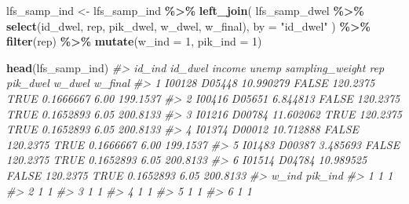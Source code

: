 \documentclass[
]{article}
\newenvironment{Shaded}{\begin{snugshade}}{\end{snugshade}}
\newcommand{\AttributeTok}[1]{\textcolor[rgb]{0.13,0.29,0.53}{#1}}
\newcommand{\CommentTok}[1]{\textcolor[rgb]{0.56,0.35,0.01}{\textit{#1}}}
\newcommand{\DecValTok}[1]{\textcolor[rgb]{0.00,0.00,0.81}{#1}}
\newcommand{\FunctionTok}[1]{\textcolor[rgb]{0.13,0.29,0.53}{\textbf{#1}}}
\newcommand{\NormalTok}[1]{#1}
\newcommand{\OtherTok}[1]{\textcolor[rgb]{0.56,0.35,0.01}{#1}}
\newcommand{\SpecialCharTok}[1]{\textcolor[rgb]{0.81,0.36,0.00}{\textbf{#1}}}
\newcommand{\StringTok}[1]{\textcolor[rgb]{0.31,0.60,0.02}{#1}}
\begin{document}
\begin{Shaded}
\begin{Highlighting}[]
\NormalTok{lfs\_samp\_ind }\OtherTok{\textless{}{-}}\NormalTok{ lfs\_samp\_ind }\SpecialCharTok{\%\textgreater{}\%}
  \FunctionTok{left\_join}\NormalTok{(}
\NormalTok{    lfs\_samp\_dwel }\SpecialCharTok{\%\textgreater{}\%} \FunctionTok{select}\NormalTok{(id\_dwel, rep, pik\_dwel, w\_dwel, w\_final),}
    \AttributeTok{by =} \StringTok{"id\_dwel"}
\NormalTok{  ) }\SpecialCharTok{\%\textgreater{}\%}
  \FunctionTok{filter}\NormalTok{(rep) }\SpecialCharTok{\%\textgreater{}\%}
  \FunctionTok{mutate}\NormalTok{(}\AttributeTok{w\_ind =} \DecValTok{1}\NormalTok{, }\AttributeTok{pik\_ind =} \DecValTok{1}\NormalTok{)}

\FunctionTok{head}\NormalTok{(lfs\_samp\_ind)}
\CommentTok{\#\textgreater{}   id\_ind id\_dwel    income unemp sampling\_weight  rep  pik\_dwel w\_dwel  w\_final}
\CommentTok{\#\textgreater{} 1 I00128  D05448 10.990279 FALSE        120.2375 TRUE 0.1666667   6.00 199.1537}
\CommentTok{\#\textgreater{} 2 I00416  D05651  6.844813 FALSE        120.2375 TRUE 0.1652893   6.05 200.8133}
\CommentTok{\#\textgreater{} 3 I01216  D00784 11.602062  TRUE        120.2375 TRUE 0.1652893   6.05 200.8133}
\CommentTok{\#\textgreater{} 4 I01374  D00012 10.712888 FALSE        120.2375 TRUE 0.1666667   6.00 199.1537}
\CommentTok{\#\textgreater{} 5 I01483  D00387  3.485693 FALSE        120.2375 TRUE 0.1652893   6.05 200.8133}
\CommentTok{\#\textgreater{} 6 I01514  D04784 10.989525 FALSE        120.2375 TRUE 0.1652893   6.05 200.8133}
\CommentTok{\#\textgreater{}   w\_ind pik\_ind}
\CommentTok{\#\textgreater{} 1     1       1}
\CommentTok{\#\textgreater{} 2     1       1}
\CommentTok{\#\textgreater{} 3     1       1}
\CommentTok{\#\textgreater{} 4     1       1}
\CommentTok{\#\textgreater{} 5     1       1}
\CommentTok{\#\textgreater{} 6     1       1}
\end{Highlighting}
\end{Shaded}
\end{document}
